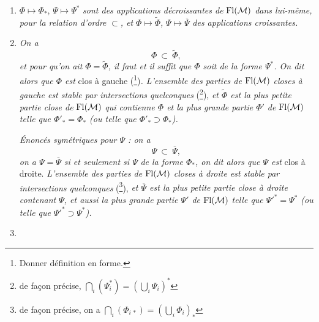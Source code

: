 \begin{enumerate}[label={}]
\item[a)] $\Phi \longmapsto \Phi_*$, $\Psi \longmapsto \Psi^*$ \textit{sont des applications décroissantes de} $\mathrm{Fl}(\mathcal{M})$ \textit{dans lui-même, pour la relation d'ordre} $\subset$\textit{, et} $\Phi \longmapsto \widetilde{\Phi}$\textit{,} $\Psi \longmapsto \overline{\Psi}$ \textit{des applications croissantes.}


\item[b)] \textit{On a}
\[
\Phi\ \subset\ \widetilde{\Phi},
\]
\textit{et pour qu'on ait $\Phi = \widetilde{\Phi}$, il faut et il suffit que $\Phi$ soit de la forme $\Psi^*$. On dit alors que $\Phi$ est} \textup{clos à gauche} (\footnote[2]{Donner définition en forme.})\textit{. L'ensemble des parties de} $\mathrm{Fl}(\mathcal{M})$ \textit{closes à gauche est stable par intersections quelconques} (\footnote[3]{de façon précise, $\bigcap_i(\Psi_i^*) = (\bigcup_i \Psi_i)^*$}), \textit{et $\widetilde{\Phi}$ est la plus petite partie close de} $\mathrm{Fl}(\mathcal{M})$ \textit{qui contienne $\Phi$ et la plus grande partie $\Phi'$ de} $\mathrm{Fl}(\mathcal{M})$ \textit{telle que $\Phi'_* = \Phi_*$ (ou telle que $\Phi'_* \supset \Phi_*$).}

\textit{Énoncés symétriques pour $\Psi$ : on a}
\[
\Psi\ \subset\ \overline{\Psi},
\]
\textit{on a $\Psi = \overline{\Psi}$ si et seulement si $\Psi$} \textit{de la forme $\Phi_*$, on dit alors que $\Psi$ est} \textup{clos à droite.} \textit{L'ensemble des parties de} $\mathrm{Fl}(\mathcal{M})$ \textit{closes à droite est stable par intersections quelconques} (\footnote[4]{de façon précise, on a $\bigcap_i(\Phi_{i\,*}) = (\bigcup_i \Phi_i)_*$}), \textit{et $\overline{\Psi}$ est la plus petite partie close à droite contenant $\Psi$, et aussi la plus grande partie $\Psi'$ de} $\mathrm{Fl}(\mathcal{M})$ \textit{telle que $\Psi'^* = \Psi^*$ (ou telle que $\Psi'^* \supset \Psi^*$).}

\item[] \hspace*{-2.5em}


\end{enumerate}
